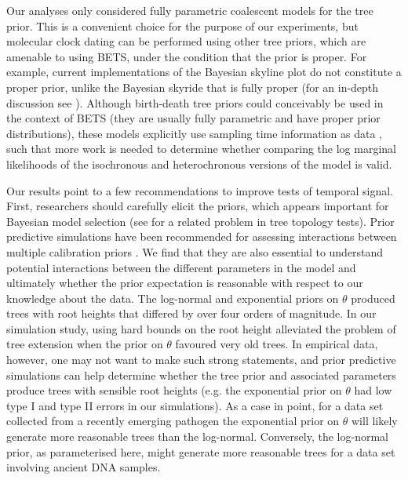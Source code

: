 \documentclass[10pt,letterpaper]{article}
\begin{document}
{Our analyses only considered fully parametric coalescent models for the tree prior. This is a convenient choice for the purpose of our experiments, but molecular clock dating can be performed using other tree priors, which are amenable to using BETS, under the condition that the prior is proper. For example, current implementations of the Bayesian skyline plot do not constitute a proper prior, unlike the Bayesian skyride that is fully proper (for an in-depth discussion see \cite{baele2014bayesian}). Although birth-death tree priors could conceivably be used in the context of BETS (they are usually fully parametric and have proper prior distributions), these models explicitly use sampling time information as data \cite{boskova2018influence}, such that more work is needed to determine whether comparing the log marginal likelihoods of the isochronous and heterochronous versions of the model is valid.}

Our results point to a few recommendations to improve tests of temporal signal. First, researchers should carefully elicit the priors, which appears important for Bayesian model selection (see \cite{bergsten2013bayesian} for a related problem in tree topology tests). Prior predictive simulations have been recommended for assessing interactions between multiple calibration priors \cite{warnock2015calibration}. We find that they are also essential to understand potential interactions between the different parameters in the model and ultimately whether the prior expectation is reasonable with respect to our knowledge about the data. The log-normal and exponential priors on $\theta$ produced trees with root heights that differed by over four orders of magnitude. {In our simulation study, using hard bounds on the root height alleviated the problem of tree extension when the prior on $\theta$ favoured very old trees. In empirical data, however, one may not want to make such strong statements, and prior predictive simulations can help determine whether the tree prior and associated parameters produce trees with sensible root heights (e.g. the exponential prior on $\theta$ had low type I and type II errors in our simulations). As a case in point, for a data set collected from a recently emerging pathogen the exponential prior on $\theta$ will likely generate more reasonable trees than the log-normal. Conversely, the log-normal prior, as parameterised here, might generate more reasonable trees for a data set involving ancient DNA samples.}
\end{document}
